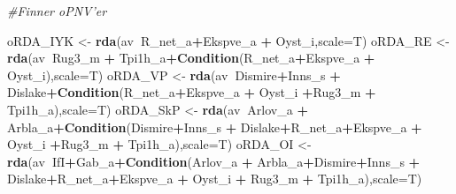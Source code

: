 \documentclass[]{article}
\newenvironment{Shaded}{\begin{snugshade}}{\end{snugshade}}
\newcommand{\CommentTok}[1]{\textcolor[rgb]{0.56,0.35,0.01}{\textit{#1}}}
\newcommand{\DataTypeTok}[1]{\textcolor[rgb]{0.13,0.29,0.53}{#1}}
\newcommand{\KeywordTok}[1]{\textcolor[rgb]{0.13,0.29,0.53}{\textbf{#1}}}
\newcommand{\NormalTok}[1]{#1}
\newcommand{\OperatorTok}[1]{\textcolor[rgb]{0.81,0.36,0.00}{\textbf{#1}}}
\newcommand{\StringTok}[1]{\textcolor[rgb]{0.31,0.60,0.02}{#1}}
\begin{document}
\begin{Shaded}
\begin{Highlighting}[]
\CommentTok{#Finner oPNV'er}

\NormalTok{oRDA_IYK <-}\StringTok{ }\KeywordTok{rda}\NormalTok{(av}\OperatorTok{~}\NormalTok{R_net_a}\OperatorTok{+}\NormalTok{Ekspve_a  }\OperatorTok{+}\StringTok{ }\NormalTok{Oyst_i,}\DataTypeTok{scale=}\NormalTok{T)}
\NormalTok{oRDA_RE <-}\StringTok{ }\KeywordTok{rda}\NormalTok{(av}\OperatorTok{~}\NormalTok{Rug3_m }\OperatorTok{+}\StringTok{ }\NormalTok{Tpi1h_a}\OperatorTok{+}\KeywordTok{Condition}\NormalTok{(R_net_a}\OperatorTok{+}\NormalTok{Ekspve_a  }\OperatorTok{+}\StringTok{ }\NormalTok{Oyst_i),}\DataTypeTok{scale=}\NormalTok{T)}
\NormalTok{oRDA_VP <-}\StringTok{ }\KeywordTok{rda}\NormalTok{(av}\OperatorTok{~}\NormalTok{Dismire}\OperatorTok{+}\NormalTok{Inns_s }\OperatorTok{+}\StringTok{ }\NormalTok{Dislake}\OperatorTok{+}\KeywordTok{Condition}\NormalTok{(R_net_a}\OperatorTok{+}\NormalTok{Ekspve_a  }\OperatorTok{+}\StringTok{ }\NormalTok{Oyst_i }\OperatorTok{+}\NormalTok{Rug3_m }\OperatorTok{+}\StringTok{ }\NormalTok{Tpi1h_a),}\DataTypeTok{scale=}\NormalTok{T)}
\NormalTok{oRDA_SkP <-}\StringTok{ }\KeywordTok{rda}\NormalTok{(av}\OperatorTok{~}\NormalTok{Arlov_a }\OperatorTok{+}\StringTok{ }\NormalTok{Arbla_a}\OperatorTok{+}\KeywordTok{Condition}\NormalTok{(Dismire}\OperatorTok{+}\NormalTok{Inns_s }\OperatorTok{+}\StringTok{ }\NormalTok{Dislake}\OperatorTok{+}\NormalTok{R_net_a}\OperatorTok{+}\NormalTok{Ekspve_a  }\OperatorTok{+}\StringTok{ }\NormalTok{Oyst_i }\OperatorTok{+}\NormalTok{Rug3_m }\OperatorTok{+}\StringTok{ }\NormalTok{Tpi1h_a),}\DataTypeTok{scale=}\NormalTok{T)}
\NormalTok{oRDA_OI <-}\StringTok{ }\KeywordTok{rda}\NormalTok{(av}\OperatorTok{~}\NormalTok{IfI}\OperatorTok{+}\NormalTok{Gab_a}\OperatorTok{+}\KeywordTok{Condition}\NormalTok{(Arlov_a }\OperatorTok{+}\StringTok{ }\NormalTok{Arbla_a}\OperatorTok{+}\NormalTok{Dismire}\OperatorTok{+}\NormalTok{Inns_s }\OperatorTok{+}\StringTok{ }\NormalTok{Dislake}\OperatorTok{+}\NormalTok{R_net_a}\OperatorTok{+}\NormalTok{Ekspve_a  }\OperatorTok{+}\StringTok{ }\NormalTok{Oyst_i }\OperatorTok{+}\StringTok{ }\NormalTok{Rug3_m }\OperatorTok{+}\StringTok{ }\NormalTok{Tpi1h_a),}\DataTypeTok{scale=}\NormalTok{T)}
\end{Highlighting}
\end{Shaded}

\begin{Shaded}
\end{Shaded}
\end{document}
